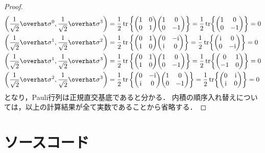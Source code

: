 \documentclass{report}
\begin{document}
$$\begin{proof}
\begin{align}
        \qty(\frac{1}{\sqrt{2}}\hat{\sigma}^0, \frac{1}{\sqrt{2}}\hat{\sigma}^3) &= \frac{1}{2}\tr\qty{\mqty(1 & 0 \\ 0 & 1)\mqty(1 & 0 \\ 0 & -1)} = \frac{1}{2}\tr{\mqty(1 & 0 \\ 0 & -1)} = 0 \\
        \qty(\frac{1}{\sqrt{2}}\hat{\sigma}^1, \frac{1}{\sqrt{2}}\hat{\sigma}^2) &= \frac{1}{2}\tr\qty{\mqty(0 & 1 \\ 1 & 0)\mqty(0 & -\i \\ \i & 0)} = \frac{1}{2}\tr{\mqty(\i & 0 \\ 0 & -\i)} = 0 \\ 
        \qty(\frac{1}{\sqrt{2}}\hat{\sigma}^1, \frac{1}{\sqrt{2}}\hat{\sigma}^3) &= \frac{1}{2}\tr\qty{\mqty(0 & 1 \\ 1 & 0)\mqty(1 & 0 \\ 0 & -1)} = \frac{1}{2}\tr{\mqty(0 & 1 \\ -1 & 0)} = 0 \\ 
        \qty(\frac{1}{\sqrt{2}}\hat{\sigma}^2, \frac{1}{\sqrt{2}}\hat{\sigma}^3) &= \frac{1}{2}\tr\qty{\mqty(0 & -\i \\ \i & 0)\mqty(1 & 0 \\ 0 & -1)} = \frac{1}{2}\tr{\mqty(0 & \i \\ \i & 0)} = 0 
      \end{align}
      となり，Pauli行列は正規直交基底であると分かる．
      内積の順序入れ替えについては，以上の計算結果が全て実数であることから省略する．
    \end{proof}
  \chapter{ソースコード}
    \inputminted[linenos, frame=lines, label=qst-code]{python}{/home/hawk/desktop/lab/b4_seminar/experiment/qst/main.py}
\end{document}
